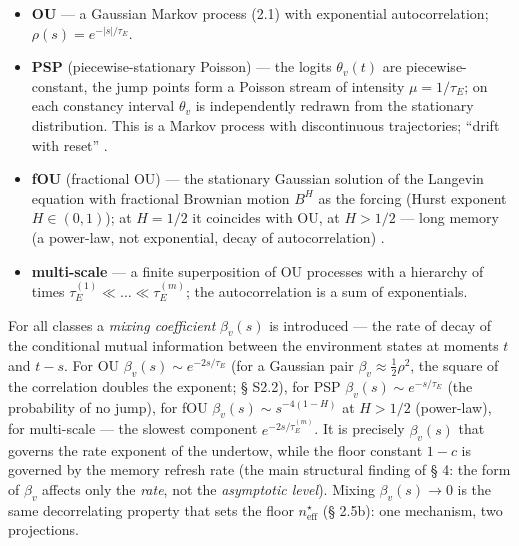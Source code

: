 \documentclass[12pt]{iopart}
\providecommand{\tightlist}{\setlength{\itemsep}{0pt}\setlength{\parskip}{0pt}}
\begin{document}
\begin{itemize}

\tightlist

\item

  \textbf{OU} --- a Gaussian Markov process (2.1) with exponential autocorrelation; \(\rho(s) = e^{-|s|/\tau_E}\).

\item

  \textbf{PSP} (piecewise-stationary Poisson) --- the logits \(\theta_v(t)\) are piecewise-constant, the jump points form a Poisson stream of intensity \(\mu = 1/\tau_E\); on each constancy interval \(\theta_v\) is independently redrawn from the stationary distribution. This is a Markov process with discontinuous trajectories; ``drift with reset'' \cite{Andriishin2026b}.

\item

  \textbf{fOU} (fractional OU) --- the stationary Gaussian solution of the Langevin equation with fractional Brownian motion \(B^H\) as the forcing (Hurst exponent \(H \in (0,1)\)); at \(H = 1/2\) it coincides with OU, at \(H > 1/2\) --- long memory (a power-law, not exponential, decay of autocorrelation) \cite{Mandelbrot1968,Cheridito2003}.

\item

  \textbf{multi-scale} --- a finite superposition of OU processes with a hierarchy of times \(\tau_E^{(1)} \ll \dots \ll \tau_E^{(m)}\); the autocorrelation is a sum of exponentials.

\end{itemize}



For all classes a \emph{mixing coefficient} \(\beta_v(s)\) is introduced --- the rate of decay of the conditional mutual information between the environment states at moments \(t\) and \(t-s\). For OU \(\beta_v(s) \sim e^{-2s/\tau_E}\) (for a Gaussian pair \(\beta_v \approx \tfrac12\rho^2\), the square of the correlation doubles the exponent; § S2.2), for PSP \(\beta_v(s) \sim e^{-s/\tau_E}\) (the probability of no jump), for fOU \(\beta_v(s) \sim s^{-4(1-H)}\) at \(H > 1/2\) (power-law), for multi-scale --- the slowest component \(e^{-2s/\tau_E^{(m)}}\). It is precisely \(\beta_v(s)\) that governs the rate exponent of the undertow, while the floor constant \(1 - c\) is governed by the memory refresh rate (the main structural finding of § 4: the form of \(\beta_v\) affects only the \emph{rate}, not the \emph{asymptotic level}). Mixing \(\beta_v(s) \to 0\) is the same decorrelating property that sets the floor \(n_{\text{eff}}^\star\) (§ 2.5b): one mechanism, two projections.
\end{document}
